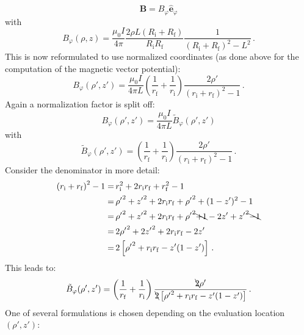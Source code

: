 \begin{equation}
 \mathbf{B} = B_\varphi \hat{\mathbf{e}}_\varphi
\end{equation}
with
\begin{equation}
 B_\varphi (\rho, z)
 = \frac{\mu_0 I}{4 \pi}
   \frac{2 \rho L (R_\mathrm{i} + R_\mathrm{f})}{R_\mathrm{i} R_\mathrm{f}}
   \frac{1}{\left(R_\mathrm{i} + R_\mathrm{f}\right)^2 - L^2} \, .
\end{equation}
This is now reformulated to use normalized coordinates
(as done above for the computation of the magnetic vector potential):
\begin{equation}
 B_\varphi(\rho', z')
 = \frac{\mu_0 I}{4 \pi L}
   \left(\frac{1}{r_\mathrm{f}} + \frac{1}{r_\mathrm{i}} \right)
   \frac{2 \rho'}{\left( r_\mathrm{i} + r_\mathrm{f} \right)^2 - 1} \, .
\end{equation}
Again a normalization factor is split off:
\begin{equation}
  B_\varphi(\rho', z') = \frac{\mu_0 I}{4 \pi L} \tilde{B}_\varphi(\rho', z')
\end{equation}
with
\begin{equation}
  \tilde{B}_\varphi(\rho', z')
  = \left(\frac{1}{r_\mathrm{f}} + \frac{1}{r_\mathrm{i}} \right)
    \frac{2 \rho'}{\left( r_\mathrm{i} + r_\mathrm{f} \right)^2 - 1} \, .
\end{equation}
Consider the denominator in more detail:
\begin{align}
 \left(r_\mathrm{i} + r_\mathrm{f}\right)^2 - 1
 =&\, r_\mathrm{i}^2 + 2 r_\mathrm{i} r_\mathrm{f} + r_\mathrm{f}^2 - 1 \nonumber \\
 =&\, {\rho'}^2 + {z'}^2 + 2 r_\mathrm{i} r_\mathrm{f} + {\rho'}^2 + (1 - z')^2 - 1 \nonumber \\
 =&\, {\rho'}^2 + {z'}^2 + 2 r_\mathrm{i} r_\mathrm{f} + {\rho'}^2 \bcancel{+ 1} - 2 z' + {z'}^2 \bcancel{- 1} \nonumber \\
 =&\, 2 {\rho'}^2 + 2 {z'}^2 + 2 r_\mathrm{i} r_\mathrm{f} - 2 z' \nonumber \\
 =&\, 2 \left[ {\rho'}^2 + r_\mathrm{i} r_\mathrm{f} - z' (1 - z') \right] \, .
\end{align}
This leads to:
\begin{equation}
 \tilde{B}_\varphi(\rho', z')
  = \left(\frac{1}{r_\mathrm{f}} + \frac{1}{r_\mathrm{i}} \right)
    \frac{\bcancel{2} \rho'}{\bcancel{2} \left[ {\rho'}^2 + r_\mathrm{i} r_\mathrm{f} - z' (1 - z') \right]} \, . \label{eqn:bPhiTilde}
\end{equation}
One of several formulations is chosen depending on the evaluation location~$(\rho', z')$:
